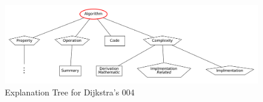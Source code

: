 \begin{figure}
  \includegraphics[scale=0.2]{DJK_tree}
    
    
\caption{Explanation Tree for Dijkstra's 004}
\label{fig:djk-tree}
\end{figure}